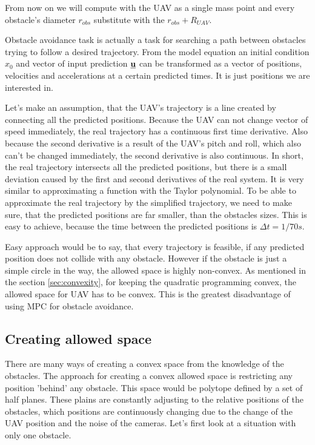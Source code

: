 \documentclass{article}
\newcommand{\uvec}{\textbf{\underline{u}}}
\begin{document}
From now on we will compute with the UAV as a single mass point and every obstacle's diameter $r_{obs}$ substitute with the $r_{obs} + R_{UAV}$.	

Obstacle avoidance task is actually a task for searching a path between obstacles trying to follow a desired trajectory. From the model equation an initial condition $x_0$ and vector of input prediction $\uvec$ can be transformed as a vector of positions, velocities and accelerations at a certain predicted times. It is just positions we are interested in. 

Let's make an assumption, that the UAV's trajectory is a line created by connecting all the predicted positions. Because the UAV can not change vector of speed immediately, the real trajectory has a continuous first time derivative. Also because the second derivative is a result of the UAV's pitch and roll, which also can't be changed immediately, the second derivative is also continuous. In short, the real trajectory intersects all the predicted positions, but there is a small deviation caused by the first and second derivatives of the real system. It is very similar to approximating a function with the Taylor polynomial. To be able to approximate the real trajectory by the simplified trajectory, we need to make sure, that the predicted positions are far smaller, than the obstacles sizes. This is easy to achieve, because the time between the predicted positions is $\Delta t = 1/70s$.

Easy approach would be to say, that every trajectory is feasible, if any predicted position does not collide with any obstacle. However if the obstacle is just a simple circle in the way, the allowed space is highly non-convex. As mentioned in the section \ref{sec:convexity}, for keeping the quadratic programming convex, the allowed space for UAV has to be convex. This is the greatest disadvantage of using MPC for obstacle avoidance. 

\subsection{Creating allowed space}

There are many ways of creating a convex space from the knowledge of the obstacles.
The approach for creating a convex allowed space is restricting any position 'behind' any obstacle. This space would be polytope defined by a set of half planes. These plains are constantly adjusting to the relative positions of the obstacles, which positions are continuously changing due to the change of the UAV position and the noise of the cameras. Let's first look at a situation with only one obstacle. 
\end{document}
